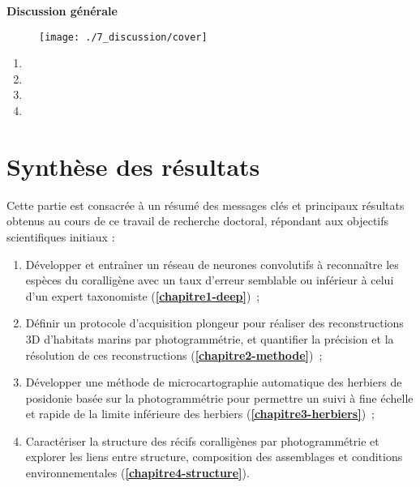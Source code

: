 \setcounter{section}{0} %
\renewcommand*{\theHsection}{Discussion.\the\value{section}}

\centerline{\bfseries\textcolor{bleusection}{ \Huge Discussion générale}}  

\bigskip

\begin{figure}[H] 
	\begin{center}
	\texttt{[image: ./7\_discussion/cover]}
    \end{center}
\end{figure}

{\LARGE
\begin{enumerate}[label=\textcolor{bleusection}{\arabic*}{.}, leftmargin=2cm]
  \item {}
  \item {}
  \item {}
  \item {}
\end{enumerate}
}

\clearpage
\pagestyle{discussion}

\section{Synthèse des résultats}\label{discussion.1}

Cette partie est consacrée à un résumé des messages clés et principaux résultats obtenus au cours de ce travail de recherche doctoral, répondant aux objectifs scientifiques initiaux :

\begin{enumerate}
    \item Développer et entraîner un réseau de neurones convolutifs à reconnaître les espèces du coralligène avec un taux d’erreur semblable ou inférieur à celui d’un expert taxonomiste  (\textbf{\autoref{chapitre1-deep}})~;
    
    \item Définir un protocole d’acquisition plongeur pour réaliser des reconstructions 3D d’habitats marins par photogrammétrie, et quantifier la précision et la résolution de ces reconstructions  (\textbf{\autoref{chapitre2-methode}})~;
    
    \item Développer une méthode de microcartographie automatique des herbiers de posidonie basée sur la photogrammétrie pour permettre un suivi à fine échelle et rapide de la limite inférieure des herbiers  (\textbf{\autoref{chapitre3-herbiers}})~;
    
    \item Caractériser la structure des récifs coralligènes par photogrammétrie et explorer les liens entre structure, composition des assemblages et conditions environnementales (\textbf{\autoref{chapitre4-structure}}).
    
\end{enumerate}

